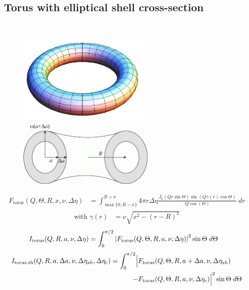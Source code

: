 \subsection{Torus with elliptical shell cross-section}  \cite{Kawaguchi2001,Forster1999}
\label{sect:Torus}
\hspace{1pt}\\

\begin{figure}[htb]
\begin{center}
\includegraphics[width=0.575\textwidth]{torus.png}
\end{center}
\begin{center}
\includegraphics[width=0.6\textwidth]{torus_sh_xsect.png}
\end{center}
\caption{} \label{torus}
\end{figure}
\begin{align}
F_\text{torus}(Q,\Theta,R,x,\nu,\Delta\eta) & = \int_{\operatorname{max}\{0,R-x\}}^{R+x}
4\pi r \Delta\eta \frac{J_0(Qr\sin\Theta) \sin(
Q\gamma(r)\cos\Theta)}{Q\cos(\Theta)} \; dr \label{eq:torus1}
\end{align}
\begin{align}
\text{with } \gamma(r) &= \nu \sqrt{x^2-(r-R)^2}
\end{align}
\begin{align}
I_\text{torus}(Q,R,a,\nu,\Delta\eta) &= \int_0^{\pi/2}
\abs{F_\text{torus}(Q,\Theta,R,a,\nu,\Delta\eta)}^2 \sin\Theta  \;
d\Theta
\end{align}
\begin{align}
I_\text{torus,sh}(Q,R,a,\Delta a,\nu,\Delta\eta_{sh},\Delta\eta_c)
= \int_0^{\pi/2} \Bigl\lvert & F_\text{torus}(Q,\Theta,R,a+\Delta
a,\nu,\Delta\eta_{sh}) \\
-&F_\text{torus}(Q,\Theta,R,a,\nu,\Delta\eta_c)\Bigr\rvert^2
\sin\Theta  \;  d\Theta \nonumber
\end{align}
